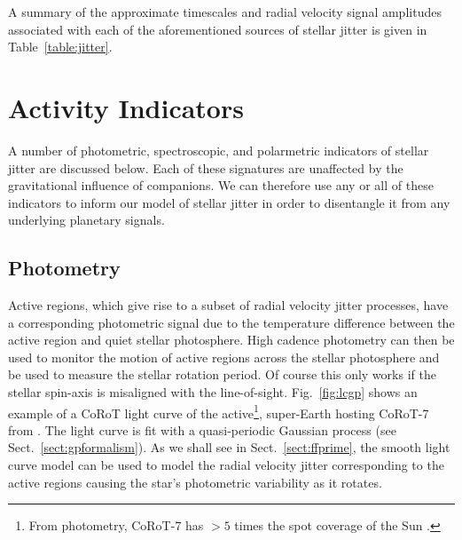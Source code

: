 A summary of the approximate timescales and radial velocity signal amplitudes associated with 
each of the aforementioned sources of stellar jitter is given in Table~\ref{table:jitter}.

\begin{landscape}

\end{landscape}
\restoregeometry

\section{Activity Indicators} \label{sect:diagnostics}
A number of photometric, spectroscopic, and polarmetric indicators of stellar jitter are 
discussed below. 
Each of these signatures are unaffected by the gravitational influence of companions. We can 
therefore use any or all of these indicators to inform our model of stellar jitter in order 
to disentangle it from any underlying planetary signals. 

\subsection{Photometry}
Active regions, which give rise to a subset of radial velocity jitter processes, have a 
corresponding photometric signal due to the temperature difference between the active 
region and quiet stellar photosphere. High cadence photometry can then be used to monitor 
the motion of active regions across the stellar photosphere and be used to measure the 
stellar rotation period. Of course this only works if the stellar spin-axis is misaligned 
with the line-of-sight. Fig.~\ref{fig:lcgp} shows an example of a CoRoT light curve of the 
active\footnote{From photometry, CoRoT-7 has $>5$ times the spot coverage of the Sun 
\parencite{queloz09}.}, super-Earth hosting CoRoT-7 from \cite{haywood14}. The light curve 
is fit with a quasi-periodic Gaussian process (see Sect.~\ref{sect:gpformalism}). As we 
shall see in Sect.~\ref{sect:ffprime}, the smooth light curve model can be used to model the 
radial velocity jitter corresponding to the active regions causing the star's photometric 
variability as it rotates. \\

